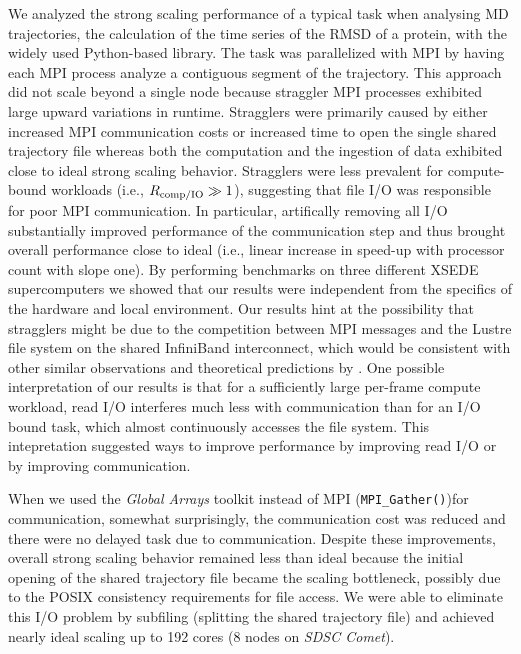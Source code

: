 \label{sec:conclusions}

We analyzed the strong scaling performance of a typical task when analysing MD trajectories, the calculation of the time series of the RMSD of a protein, with the widely used Python-based  library.
The task was parallelized with MPI by having each MPI process analyze a contiguous segment of the trajectory.
This approach did not scale beyond a single node because straggler MPI processes exhibited large upward variations in runtime.
Stragglers were primarily caused by either increased MPI communication costs or increased time to open the single shared trajectory file whereas both the computation and the ingestion of data exhibited close to ideal strong scaling behavior.
Stragglers were less prevalent for compute-bound workloads (i.e., $R_{\text{comp/IO}} \gg 1$), suggesting that file I/O was responsible for poor MPI communication.
In particular, artifically removing all I/O substantially improved performance of the communication step and thus brought overall performance close to ideal (i.e., linear increase in speed-up with processor count with slope one).
By performing benchmarks on three different XSEDE supercomputers we showed that our results were independent from the specifics of the hardware and local environment.
Our results hint at the possibility that stragglers might be due to the competition between MPI messages and the Lustre file system on the shared InfiniBand interconnect, which would be consistent with other similar observations \cite{VMD2013} and theoretical predictions by \citet{Brown:2018ab}.
One possible interpretation of our results is that for a sufficiently large per-frame compute workload, read I/O interferes much less with communication than for an I/O bound task, which almost continuously accesses the file system.
This intepretation suggested ways to improve performance by improving read I/O or by improving communication.

When we used the \emph{Global Arrays} toolkit instead of MPI (\texttt{MPI\_Gather()})for communication, somewhat surprisingly, the communication cost was reduced and there were no delayed task due to communication.
Despite these improvements, overall strong scaling behavior remained less than ideal because the initial opening of the shared trajectory file became the scaling bottleneck, possibly due to the POSIX consistency requirements for file access.
We were able to eliminate this I/O problem by subfiling (splitting the shared trajectory file) and achieved nearly ideal scaling up to 192 cores (8 nodes on \emph{SDSC Comet}).

